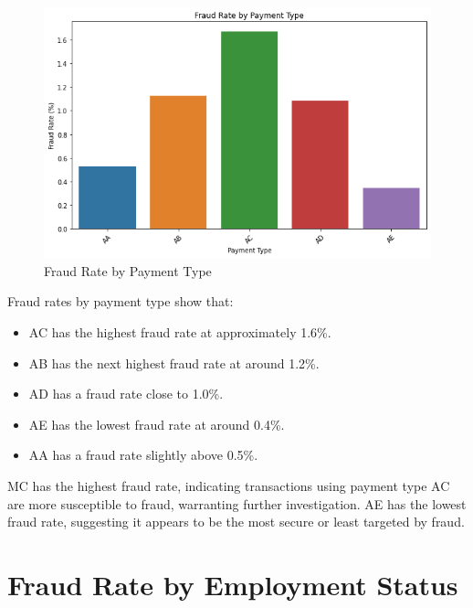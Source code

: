 \documentclass[12pt,a4paper]{report}
\begin{document}
\begin{figure}[h]
    \centering
    \includegraphics[width=\textwidth]{payment_type_fraud_rate.png}
    \caption{Fraud Rate by Payment Type}
    \label{fig:payment_type_fraud_rate}
\end{figure}


Fraud rates by payment type show that:

\begin{itemize}
    \item AC has the highest fraud rate at approximately 1.6\%.
    \item AB has the next highest fraud rate at around 1.2\%.
    \item AD has a fraud rate close to 1.0\%.
    \item AE has the lowest fraud rate at around 0.4\%.
    \item AA has a fraud rate slightly above 0.5\%.
\end{itemize}

MC has the highest fraud rate, indicating transactions using payment type AC are more susceptible to fraud, warranting further investigation. AE has the lowest fraud rate, suggesting it appears to be the most secure or least targeted by fraud.

\section{Fraud Rate by Employment Status}
\end{document}
